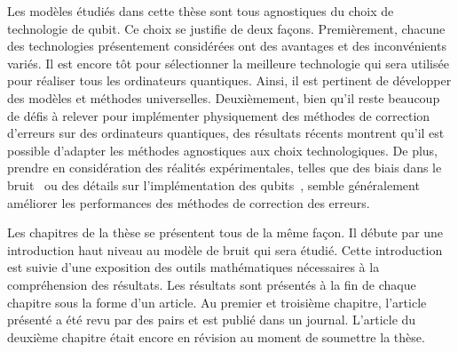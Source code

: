 Les modèles étudiés dans cette thèse sont tous agnostiques du choix de technologie de qubit.
Ce choix se justifie de deux façons.
Premièrement,
chacune des technologies présentement considérées ont des avantages et des inconvénients variés.
Il est encore tôt pour sélectionner la meilleure technologie qui sera utilisée pour réaliser
tous les ordinateurs quantiques.
Ainsi, il est pertinent de développer des modèles et méthodes universelles.
Deuxièmement,
bien qu'il reste beaucoup de défis à relever pour implémenter physiquement des méthodes
de correction d'erreurs sur des ordinateurs quantiques,
des résultats récents montrent qu'il est possible d'adapter les méthodes agnostiques
aux choix technologiques.
De plus,
prendre en considération des réalités expérimentales,
telles que des biais dans le bruit~\cite{tuckett_ultrahigh_2018}
ou des détails sur l'implémentation des qubits~\cite{noh_fault-tolerant_2020, darmawan_practical_2021},
semble généralement améliorer les performances des méthodes de correction des erreurs.

Les chapitres de la thèse se présentent tous de la même façon.
Il débute par une introduction haut niveau au modèle de bruit qui sera étudié.
Cette introduction est suivie d'une exposition des outils mathématiques nécessaires à
la compréhension des résultats.
Les résultats sont présentés à la fin de chaque chapitre sous la forme d'un article.
Au premier et troisième chapitre,
l'article présenté a été revu par des pairs et est publié dans un journal.
L'article du deuxième chapitre était encore en révision au moment de soumettre la thèse.
